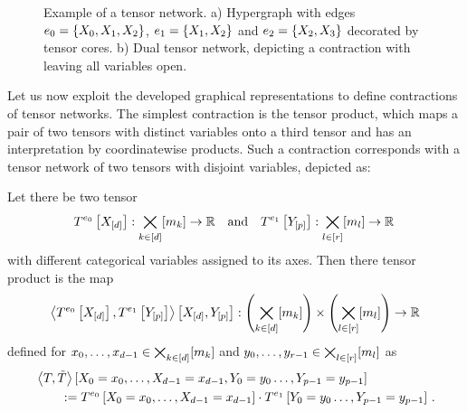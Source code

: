 \begin{figure}
	\begin{center}
		
	\end{center}
	\caption{
	Example of a tensor network.
	a) Hypergraph with edges $e_0=\{X_{0},X_{1},X_{2}\}$, $e_1=\{X_{1},X_{2}\}$ and $e_2=\{X_{2},X_{3}\}$ decorated by tensor cores.
	b) Dual tensor network, depicting a contraction with leaving all variables open.
	}\label{fig:network}
\end{figure}






Let us now exploit the developed graphical representations to define contractions of tensor networks.
The simplest contraction is the tensor product, which maps a pair of two tensors with distinct variables onto a third tensor and has an interpretation by coordinatewise products.
Such a contraction corresponds with a tensor network of two tensors with disjoint variables, depicted as:
\begin{center}
	
\end{center}

\begin{definition}\label{def:tensorProduct}
	Let there be two tensor
	\begin{align*}
		T^{e_0}\left[X_{[d]}\right] : \bigtimes_{k\in[d]}[m_{k}] \rightarrow \mathbb{R} \quad \text{and} \quad  T^{e_1}\left[Y_{[p]}\right] : \bigtimes_{l\in[r]}[m_{l}] \rightarrow \mathbb{R} \,
	\end{align*}
	with different categorical variables assigned to its axes.
	Then there tensor product is the map
	\begin{align*}
		\left\langle T^{e_0}\left[X_{[d]}\right],T^{e_1}\left[Y_{[p]}\right]\right\rangle \left[ X_{[d]},Y_{[p]} \right] :  \left(\bigtimes_{k\in[d]}[m_{k}]\right) \times \left(\bigtimes_{l\in[r]}[m_{l}]\right) \rightarrow \mathbb{R}
	\end{align*}
	defined for $x_{0},\ldots,x_{d-1}\in\bigtimes_{k\in[d]}[m_{k}]$ and ${y_{0},\ldots,y_{r-1}}\in\bigtimes_{l\in[r]}[m_{l}]$ as
	\begin{align*}
		& \left\langle T,\tilde{T}\right\rangle \left[ X_{0}=x_{0},\ldots,X_{d-1}=x_{d-1},Y_{0}=y_{0}\ldots,Y_{p-1}=y_{p-1} \right] \\
		&\quad\quad :=  T^{e_0}\left[X_{0}=x_{0},\ldots,X_{d-1}=x_{d-1}\right]\cdot T^{e_1}\left[Y_{0}=y_{0}\ldots,Y_{p-1}=y_{p-1}\right] \, .
	\end{align*}
\end{definition}

